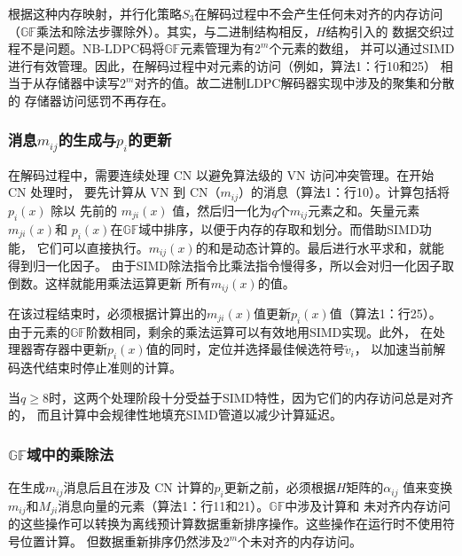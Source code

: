 \documentclass{cjc}
\begin{document}
  根据这种内存映射，并行化策略$S_3$在解码过程中不会产生任何未对齐的内存访问
  （$\mathbb{GF}$乘法和除法步骤除外）。其实，与二进制结构相反，$H$结构引入的
  数据交织过程不是问题。NB-LDPC码将$\mathbb{GF}$元素管理为有$2^m$个元素的数组，
  并可以通过SIMD进行有效管理。因此，在解码过程中对元素的访问（例如，算法1：行10和25）
  相当于从存储器中读写$2^m$对齐的值。故二进制LDPC解码器实现中涉及的聚集和分散的
  存储器访问惩罚不再存在。

\subsubsection{消息\texorpdfstring{$m_{ij}$}{mij}的生成与\texorpdfstring{$p_i$}{pi}的更新}

  在解码过程中，需要连续处理 CN 以避免算法级的 VN 访问冲突管理。在开始 CN 处理时，
  要先计算从 VN 到 CN（$m_{ij}$）的消息（算法1：行10）。计算包括将 $p_i(x)$ 除以
  先前的 $m_{ji}(x)$ 值，然后归一化为$q$个$m_{ij}$元素之和。矢量元素$m_{ji}(x)$和
  $p_i(x)$在$\mathbb{GF}$域中排序，以便于内存的存取和划分。而借助SIMD功能，
  它们可以直接执行。$m_{ij}(x)$的和是动态计算的。最后进行水平求和，就能得到归一化因子。
  由于SIMD除法指令比乘法指令慢得多，所以会对归一化因子取倒数。这样就能用乘法运算更新
  所有$m_{ij}(x)$的值。

  在该过程结束时，必须根据计算出的$m_{ji}(x)$值更新$p_i(x)$值（算法1：行25）。
  由于元素的$\mathbb{GF}$阶数相同，剩余的乘法运算可以有效地用SIMD实现。此外，
  在处理器寄存器中更新$p_i(x)$值的同时，定位并选择最佳候选符号$\tilde{v}_i$，
  以加速当前解码迭代结束时停止准则的计算。

  当$q\geq8$时，这两个处理阶段十分受益于SIMD特性，因为它们的内存访问总是对齐的，
  而且计算中会规律性地填充SIMD管道以减少计算延迟。

\subsubsection{\texorpdfstring{$\mathbb{GF}$}{GF}域中的乘除法}

  在生成$m_{ij}$消息后且在涉及 CN 计算的$p_i$更新之前，必须根据$H$矩阵的$\alpha_{ij}$
  值来变换$m_{ij}$和$M_{ji}$消息向量的元素（算法1：行11和21）。$\mathbb{GF}$中涉及计算和
  未对齐内存访问的这些操作可以转换为离线预计算数据重新排序操作。这些操作在运行时不使用符号位置计算。
  但数据重新排序仍然涉及$2^m$个未对齐的内存访问。
\end{document}
